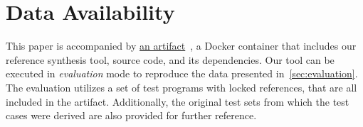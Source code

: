 \section{Data Availability}%
\label{sec:data-availability}

This paper is accompanied by \href{https://doi.org/10.5281/zenodo.14592164}{an artifact}~\cite{Pelsmaeker_OOPSLA25_Artifact}, a Docker container that includes our reference synthesis tool, source code, and its dependencies.
Our tool can be executed in \emph{evaluation} mode to reproduce the data presented in~\cref{sec:evaluation}.
The evaluation utilizes a set of test programs with locked references, that are all included in the artifact.
Additionally, the original test sets from which the test cases were derived are also provided for further reference.
